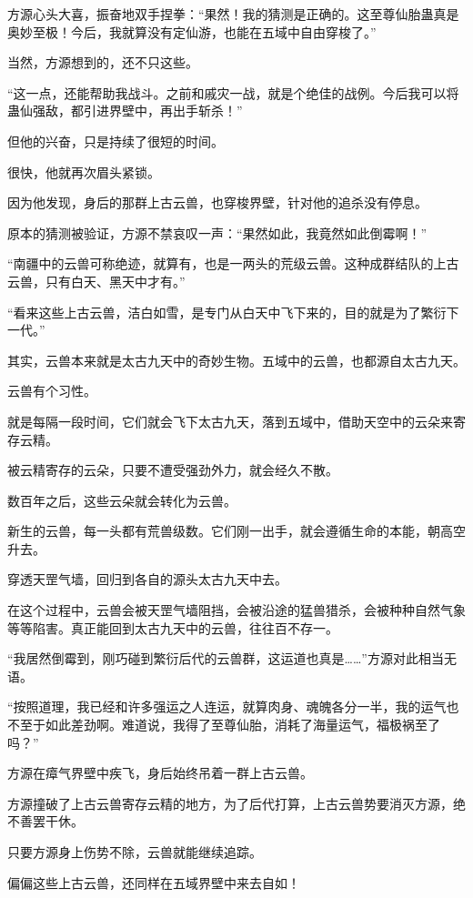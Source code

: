 \begin{this_body}
方源心头大喜，振奋地双手捏拳：“果然！我的猜测是正确的。这至尊仙胎蛊真是奥妙至极！今后，我就算没有定仙游，也能在五域中自由穿梭了。”

当然，方源想到的，还不只这些。

“这一点，还能帮助我战斗。之前和戚灾一战，就是个绝佳的战例。今后我可以将蛊仙强敌，都引进界壁中，再出手斩杀！”

但他的兴奋，只是持续了很短的时间。

很快，他就再次眉头紧锁。

因为他发现，身后的那群上古云兽，也穿梭界壁，针对他的追杀没有停息。

原本的猜测被验证，方源不禁哀叹一声：“果然如此，我竟然如此倒霉啊！”

“南疆中的云兽可称绝迹，就算有，也是一两头的荒级云兽。这种成群结队的上古云兽，只有白天、黑天中才有。”

“看来这些上古云兽，洁白如雪，是专门从白天中飞下来的，目的就是为了繁衍下一代。”

其实，云兽本来就是太古九天中的奇妙生物。五域中的云兽，也都源自太古九天。

云兽有个习性。

就是每隔一段时间，它们就会飞下太古九天，落到五域中，借助天空中的云朵来寄存云精。

被云精寄存的云朵，只要不遭受强劲外力，就会经久不散。

数百年之后，这些云朵就会转化为云兽。

新生的云兽，每一头都有荒兽级数。它们刚一出手，就会遵循生命的本能，朝高空升去。

穿透天罡气墙，回归到各自的源头太古九天中去。

在这个过程中，云兽会被天罡气墙阻挡，会被沿途的猛兽猎杀，会被种种自然气象等等陷害。真正能回到太古九天中的云兽，往往百不存一。

“我居然倒霉到，刚巧碰到繁衍后代的云兽群，这运道也真是……”方源对此相当无语。

“按照道理，我已经和许多强运之人连运，就算肉身、魂魄各分一半，我的运气也不至于如此差劲啊。难道说，我得了至尊仙胎，消耗了海量运气，福极祸至了吗？”

方源在瘴气界壁中疾飞，身后始终吊着一群上古云兽。

方源撞破了上古云兽寄存云精的地方，为了后代打算，上古云兽势要消灭方源，绝不善罢干休。

只要方源身上伤势不除，云兽就能继续追踪。

偏偏这些上古云兽，还同样在五域界壁中来去自如！

\end{this_body}

